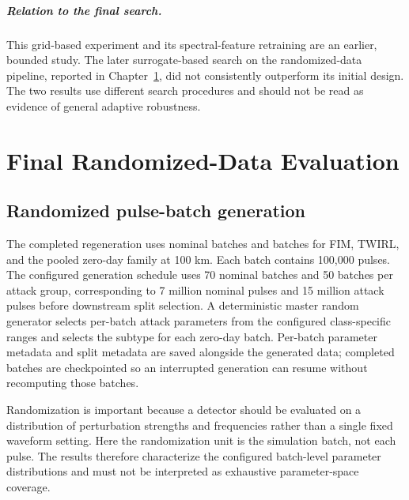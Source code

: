\documentclass[12pt, a4paper]{report}
\begin{document}

\paragraph{Relation to the final search.} This grid-based experiment and its spectral-feature retraining are an earlier, bounded study. The later surrogate-based search on the randomized-data pipeline, reported in Chapter~\ref{ch:final_eval}, did not consistently outperform its initial design. The two results use different search procedures and should not be read as evidence of general adaptive robustness.
\chapter{Final Randomized-Data Evaluation}\label{ch:final_eval}
\section{Randomized pulse-batch generation}
The completed regeneration uses nominal batches and batches for FIM, TWIRL, and the pooled zero-day family at 100 km. Each batch contains 100,000 pulses. The configured generation schedule uses 70 nominal batches and 50 batches per attack group, corresponding to 7 million nominal pulses and 15 million attack pulses before downstream split selection. A deterministic master random generator selects per-batch attack parameters from the configured class-specific ranges and selects the subtype for each zero-day batch. Per-batch parameter metadata and split metadata are saved alongside the generated data; completed batches are checkpointed so an interrupted generation can resume without recomputing those batches.

Randomization is important because a detector should be evaluated on a distribution of perturbation strengths and frequencies rather than a single fixed waveform setting. Here the randomization unit is the simulation batch, not each pulse. The results therefore characterize the configured batch-level parameter distributions and must not be interpreted as exhaustive parameter-space coverage.
\end{document}
